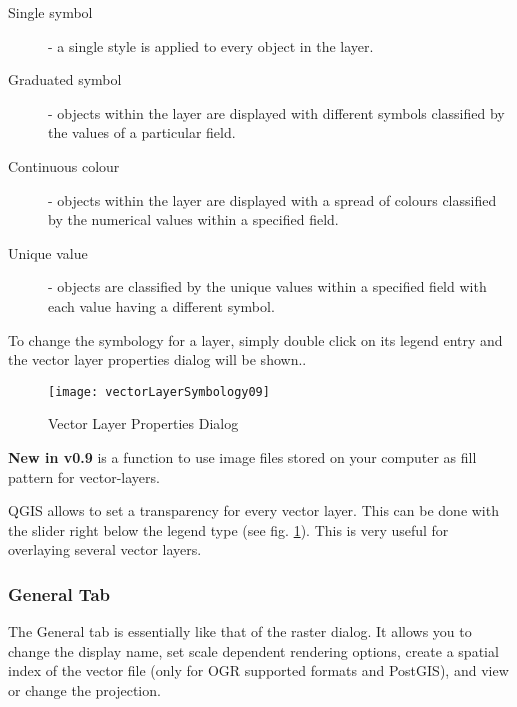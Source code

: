 \begin{description}
    \item[Single symbol] - a single style is applied to every
    object in the layer.
    \item[Graduated symbol] - objects within the layer are
    displayed with different symbols classified by the values of a
    particular field.
    \item[Continuous colour] - objects within the layer are
    displayed with a spread of colours classified by the numerical
    values within a specified field.
    \item[Unique value] - objects are classified by the unique
    values within a specified field with each value having a
    different symbol.
\end{description}

To change the symbology for a layer, simply double click on its legend 
entry and the vector layer properties dialog will be 
shown..

\begin{figure}[H]
   \begin{center}
   \caption{Vector Layer Properties
Dialog}\label{fig:vector_symbology}\smallskip
   \texttt{[image: vectorLayerSymbology09]} 
\end{center}  
\end{figure}

\textbf{New in v0.9} is a function to use image files stored on your computer 
as fill pattern for vector-layers.

 \label{sec:vect_transparency} 
QGIS \CURRENT allows to set a transparency for every vector layer. This can be done with
the slider right below the legend type (see fig. \ref{fig:vector_symbology}).
This is very useful for overlaying several vector layers.

\subsubsection{General Tab}
The General tab is essentially like that of the raster dialog. It allows you
to change the display name, set scale dependent rendering options, create a spatial 
index of the vector file (only for OGR supported formats and PostGIS), and view or
change the projection.


